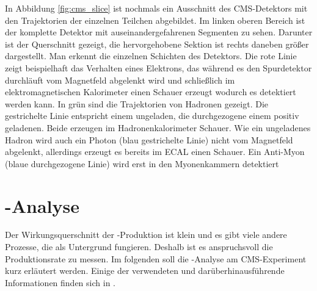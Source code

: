 In Abbildung \ref{fig:cms_slice} ist nochmals ein Ausschnitt des CMS-Detektors mit den Trajektorien der einzelnen Teilchen abgebildet. Im linken oberen Bereich ist der komplette Detektor mit auseinandergefahrenen Segmenten zu sehen. Darunter ist der Querschnitt gezeigt, die hervorgehobene Sektion ist rechts daneben gr\"o\ss er dargestellt. Man erkennt die einzelnen Schichten des Detektors. Die rote Linie zeigt beispielhaft das Verhalten eines Elektrons, das w\"ahrend es den Spurdetektor durchl\"auft vom Magnetfeld abgelenkt wird und schlie\ss lich im elektromagnetischen Kalorimeter einen Schauer erzeugt wodurch es detektiert werden kann. In gr\"un sind die Trajektorien von Hadronen gezeigt. Die gestrichelte Linie entspricht einem ungeladen, die durchgezogene einem positiv geladenen. Beide erzeugen im Hadronenkalorimeter Schauer. Wie ein ungeladenes Hadron wird auch ein Photon (blau gestrichelte Linie) nicht vom Magnetfeld abgelenkt, allerdings erzeugt es bereits im ECAL einen Schauer. Ein Anti-Myon (blaue durchgezogene Linie) wird erst in den Myonenkammern detektiert %

\section{\ttH-Analyse}
\label{ch:Experiment:sec:ttH}

Der Wirkungsquerschnitt der \ttH-Produktion ist klein und es gibt viele andere Prozesse, die als Untergrund fungieren. Deshalb ist es anspruchsvoll die Produktionsrate zu messen. Im folgenden soll die \ttH-Analyse am CMS-Experiment kurz erl\"autert werden. Einige der verwendeten und dar\"uberhinausf\"uhrende Informationen finden sich in \cite{Khachatryan:2014qaa}.


